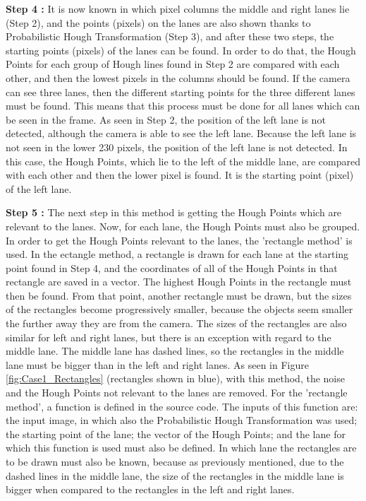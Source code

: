 \textbf{Step 4 : }It is now known in which pixel columns the middle and right lanes lie (Step 2), and the points (pixels) on the lanes are also shown thanks to Probabilistic Hough Transformation (Step 3), and after these two steps, the starting points (pixels) of the lanes can be found. In order to do that, the Hough Points for each group of Hough lines found in Step 2 are compared with each other, and then the lowest pixels in the columns should be found. If the camera can see three lanes, then the different starting points for the three different lanes must be found. This means that this process must be done for all lanes which can be seen in the frame. As seen in Step 2, the position of the left lane is not detected, although the camera is able to see the left lane. Because the left lane is not seen in the lower 230 pixels, the position of the left lane is not detected. In this case, the Hough Points, which lie to the left of the middle lane, are compared with each other and then the lower pixel is found. It is the starting point (pixel) of the left lane.


\textbf{Step 5 : }The next step in this method is getting the Hough Points which are relevant to the lanes. Now, for each lane, the Hough Points must also be grouped. In order to get the Hough Points relevant to the lanes,  the 'rectangle method' is used. In the ectangle method, a rectangle is drawn for each lane at the starting point found in Step 4, and the coordinates of all of the Hough Points in that rectangle are saved in a vector. The highest Hough Points in the rectangle must then be found. From that point, another rectangle must be drawn, but the sizes of the rectangles become progressively smaller, because the objects seem smaller the further away they are from the camera. The sizes of the rectangles are also similar for left and right lanes, but there is an exception with regard to the middle lane. The middle lane has dashed lines, so the rectangles in the middle lane must be bigger than in the left and right lanes. As seen in Figure \ref{fig:Case1_Rectangles} (rectangles shown in blue), with this method, the noise and the Hough Points not relevant to the lanes are removed. For the 'rectangle method', a function is defined in the source code. The inputs of this function are: the input image, in which also the Probabilistic Hough Transformation was used; the starting point of the lane; the vector of the Hough Points; and the lane for which this function is used must also be defined. In which lane the rectangles are to be drawn must also be known, because as previously mentioned, due to the dashed lines in the middle lane, the size of the rectangles in the middle lane is bigger when compared to the rectangles in the left and right lanes.


